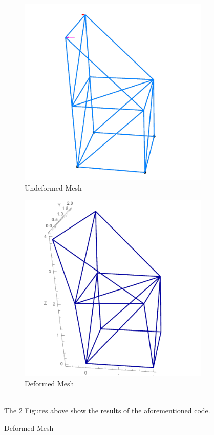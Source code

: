 \begin{figure}
	\begin{subfigure}[b]{0.4\textwidth}
		\includegraphics[width=\textwidth]{figures/undeformed}
		\caption{Undeformed Mesh}
		\label{fig:mesh}
	\end{subfigure}
	\begin{subfigure}[b]{0.4\textwidth}
		\includegraphics[width=\textwidth]{figures/deformed}
		\caption{Deformed Mesh}
		\label{fig:def_mesh}
	\end{subfigure}
	\\ \vspace{5mm}The 2 Figures above show the results of the aforementioned code.
	
\end{figure}



